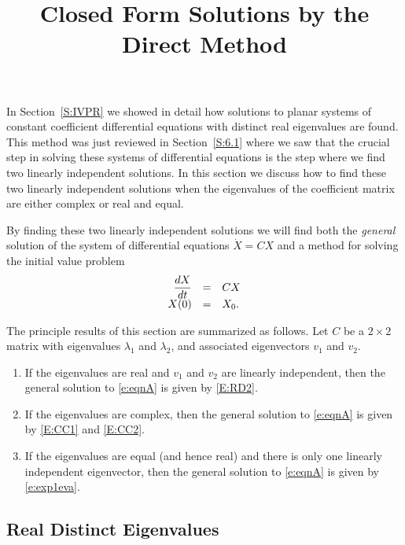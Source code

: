 \documentclass{ximera}
\title{Closed Form Solutions by the Direct Method}
\begin{document}
\begin{abstract}
\end{abstract}
\maketitle


\label{S:TDM}


In Section~\ref{S:IVPR} we showed in detail how solutions to planar systems
of constant coefficient differential equations with distinct real eigenvalues
are found.  This method was just reviewed in Section~\ref{S:6.1} where we saw
that the crucial step in solving these systems of differential equations is
the step where we find two linearly independent solutions.   In this section
we discuss how to find these two linearly independent solutions when the
eigenvalues of the coefficient matrix are either complex or real and equal.

By finding these two linearly independent solutions we will find both
the {\em general\/} solution of the system of differential equations
$\dot{X}=CX$ and a method for solving the initial value
problem
\begin{equation}  \label{e:eqnA}
\begin{array}{rcl}
\displaystyle\frac{dX}{dt} & = & CX\\
X(0) & = & X_0.
\end{array}
\end{equation}

The principle results of this section are summarized as follows.  Let 
$C$ be a $2\times 2$ matrix with eigenvalues $\lambda_1$ and
$\lambda_2$, and associated eigenvectors $v_1$ and $v_2$. 
\begin{enumerate}
\item	If the eigenvalues are real and $v_1$ and $v_2$ are linearly independent,
then the general solution to \eqref{e:eqnA} is given by \eqref{E:RD2}.
\item If the eigenvalues are complex, then the general solution to \eqref{e:eqnA} 
is given by \eqref{E:CC1} and \eqref{E:CC2}.
\item If the eigenvalues are equal (and hence real) and there is only one linearly 
independent eigenvector, then the general solution to \eqref{e:eqnA} is given by 
\eqref{e:exp1eva}. 
\end{enumerate}


\subsection*{Real Distinct Eigenvalues}
\end{document}

